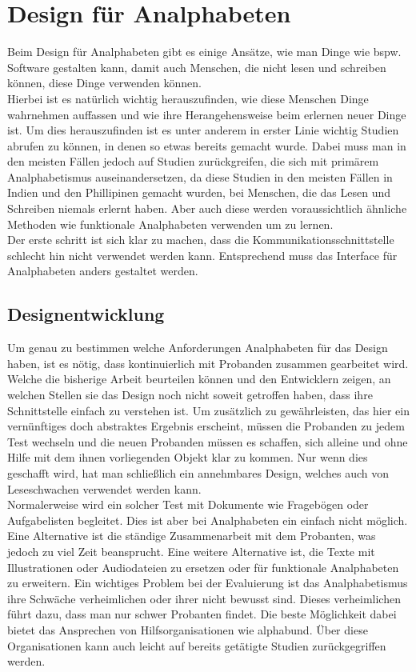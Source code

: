 \section{Design für Analphabeten}

Beim Design für Analphabeten gibt es einige Ansätze, wie man Dinge wie bspw. Software gestalten kann, damit auch Menschen, die nicht lesen und schreiben können, diese Dinge verwenden können.\\
Hierbei ist es natürlich wichtig herauszufinden, wie diese Menschen Dinge wahrnehmen auffassen und wie ihre Herangehensweise beim erlernen neuer Dinge ist. Um dies herauszufinden ist es unter anderem in erster Linie wichtig Studien abrufen zu können, in denen so etwas bereits gemacht wurde. Dabei muss man in den meisten Fällen jedoch auf Studien zurückgreifen, die sich mit primärem Analphabetismus auseinandersetzen, da diese Studien in den meisten Fällen in Indien und den Phillipinen gemacht wurden, bei Menschen, die das Lesen und Schreiben niemals erlernt haben. Aber auch diese werden voraussichtlich ähnliche Methoden wie funktionale Analphabeten verwenden um zu lernen.\\
Der erste schritt ist sich klar zu machen, dass die Kommunikationsschnittstelle schlecht hin nicht verwendet werden kann. Entsprechend muss das Interface für Analphabeten anders gestaltet werden.

\subsection{Designentwicklung}
Um genau zu bestimmen welche Anforderungen Analphabeten für das Design haben, ist es nötig, dass kontinuierlich mit Probanden zusammen gearbeitet wird. Welche die bisherige Arbeit beurteilen können und den Entwicklern zeigen, an welchen Stellen sie das Design noch nicht soweit getroffen haben, dass ihre Schnittstelle einfach zu verstehen ist. Um zusätzlich zu gewährleisten, das hier ein vernünftiges doch abstraktes Ergebnis erscheint, müssen die Probanden zu jedem Test wechseln und die neuen Probanden müssen es schaffen, sich alleine und ohne Hilfe mit dem ihnen vorliegenden Objekt klar zu kommen. Nur wenn dies geschafft wird, hat man schließlich ein annehmbares Design, welches auch von Leseschwachen verwendet werden kann.\\

Normalerweise wird ein solcher Test mit Dokumente wie Fragebögen oder Aufgabelisten begleitet. 
Dies ist aber bei Analphabeten ein einfach nicht möglich.
Eine Alternative ist die ständige Zusammenarbeit mit dem Probanten, was jedoch zu viel Zeit beansprucht. Eine weitere Alternative ist, die Texte mit Illustrationen oder Audiodateien zu ersetzen oder für funktionale Analphabeten zu erweitern. Ein wichtiges Problem bei der Evaluierung ist das Analphabetismus ihre Schwäche verheimlichen oder ihrer nicht bewusst sind. Dieses verheimlichen führt dazu, dass man nur schwer Probanten findet. Die beste Möglichkeit dabei bietet das Ansprechen von Hilfsorganisationen wie \glqq alphabund\grqq. Über diese Organisationen kann auch leicht auf bereits getätigte Studien zurückgegriffen werden.

